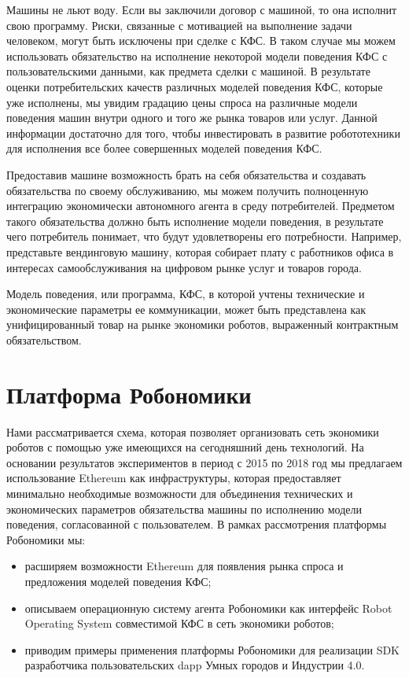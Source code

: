 \documentclass{article}
\begin{document}
Машины не льют воду.  Если вы заключили договор с машиной, то она исполнит свою программу. Риски, связанные с мотивацией на выполнение задачи человеком, могут быть исключены при сделке с КФС. В таком случае мы можем использовать обязательство на исполнение некоторой модели поведения КФС с пользовательскими данными, как предмета сделки с машиной. В результате оценки потребительских качеств различных моделей поведения КФС, которые уже исполнены, мы увидим градацию цены спроса на различные модели поведения машин внутри одного и того же рынка товаров или услуг. Данной информации достаточно для того, чтобы инвестировать в развитие робототехники для исполнения все более совершенных моделей поведения КФС.

Предоставив машине возможность брать на себя обязательства и создавать обязательства по своему обслуживанию, мы можем получить полноценную интеграцию экономически автономного агента в среду потребителей. Предметом такого обязательства должно быть исполнение модели поведения, в результате чего потребитель понимает, что будут удовлетворены его потребности. Например, представьте вендинговую машину, которая собирает плату с работников офиса в интересах самообслуживания на цифровом рынке услуг и товаров города. 

Модель поведения, или программа, КФС, в которой учтены технические и экономические параметры ее коммуникации, может быть представлена как унифицированный товар на рынке экономики роботов, выраженный контрактным обязательством.

\section{Платформа Робономики}

Нами рассматривается схема, которая позволяет организовать сеть экономики роботов с помощью уже имеющихся на сегодняшний день технологий. На основании результатов экспериментов в период с 2015 по 2018 год мы предлагаем использование Ethereum как инфраструктуры, которая предоставляет минимально необходимые возможности для объединения технических и экономических параметров обязательства машины по исполнению модели поведения, согласованной с пользователем. В рамках рассмотрения платформы Робономики мы: 

\begin{itemize}[noitemsep]
	\item расширяем возможности Ethereum для появления рынка спроса и предложения моделей поведения КФС; 
	\item описываем операционную систему агента Робономики как интерфейс Robot Operating System \cite{Quigley2009ROS:System} совместимой КФС в сеть экономики роботов;
	\item приводим примеры применения платформы Робономики для реализации SDK разработчика пользовательских dapp Умных городов и Индустрии 4.0.
\end{itemize}
\end{document}
